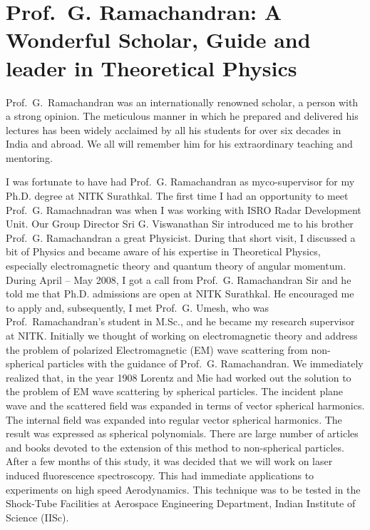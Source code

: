 \chapter[Prof.\ G. Ramachandran: A Wonderful Scholar, Guide\hfil\break and leader in Theoretical Physics]{Prof.\ G. Ramachandran: A Wonderful Scholar, Guide and leader in Theoretical Physics}\label{chap35}



Prof.\ G.\ Ramachandran was an internationally renowned scholar, a person with a strong opinion. The meticulous manner in which he prepared and delivered his lectures has been widely acclaimed by all his students for over six decades in India and abroad. We all will remember him for his extraordinary teaching and mentoring.

I was fortunate to have had Prof.\ G. Ramachandran as my\break co-supervisor for my Ph.D. degree at NITK Surathkal. The first time I had an opportunity to meet Prof.\ G. Ramachnadran was when I was working with ISRO Radar Development Unit. Our Group Director Sri G. Viswanathan Sir introduced me to his brother Prof.\ G. Ramachandran a great Physicist. During that short visit, I discussed a bit of Physics and became aware of his expertise in Theoretical Physics, especially electromagnetic theory and quantum theory of angular momentum. During April -- May 2008, I got a call from Prof.\ G. Ramachandran Sir and he told me that Ph.D. admissions are open at NITK Surathkal. He encouraged me to apply and, subsequently, I met Prof.\ G. Umesh, who was Prof.\ Ramachandran's student in M.Sc., and he became my research supervisor at NITK. Initially we thought of working on electromagnetic theory and address the problem of polarized Electromagnetic (EM) wave scattering from non-spherical particles with the guidance of Prof.\ G. Ramachandran. We immediately realized that, in the year 1908 Lorentz and Mie had worked out the solution to the problem of EM wave scattering by spherical particles. The incident plane wave and the scattered field was expanded in terms of vector spherical harmonics. The internal field was expanded into regular vector spherical harmonics. The result was expressed as spherical polynomials. There are large number of articles and books devoted to the extension of this method to non-spherical particles. After a few months of this study, it was decided that we will work on  laser induced fluorescence spectroscopy. This had immediate applications to experiments on high speed Aerodynamics. This technique was to be tested in the Shock-Tube Facilities at Aerospace Engineering Department, Indian Institute of Science (IISc).

